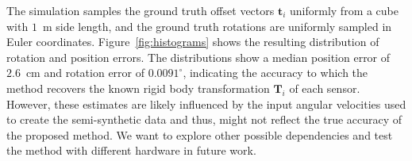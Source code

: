 \documentclass[journal]{IEEEtran}
\renewcommand{\vec}[1]{\boldsymbol{#1}}
\begin{document}
The simulation samples the ground truth offset vectors $\vec{t}_i$ uniformly from a cube with $1$~m side length, and the ground truth rotations are uniformly sampled in Euler coordinates. 
Figure~\ref{fig:histograms} shows the resulting distribution of rotation and position errors.
The distributions show a median position error of $2.6$~cm and rotation error of $0.0091^{\circ}$, indicating the accuracy to which the method recovers the known rigid body transformation $\mathbf{T}_i$ of each sensor. 
However, these estimates are likely influenced by the input angular velocities used to create the semi-synthetic data and thus, might not reflect the true accuracy of the proposed method.
We want to explore other possible dependencies and test the method with different hardware in future work.
\newline
\end{document}
